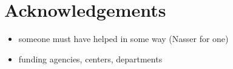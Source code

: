 \section{Acknowledgements} \label{sec:Ack}
\begin{itemize}
  \item
    someone must have helped in some way (Nasser for one)
  \item
    funding agencies, centers, departments
\end{itemize}
